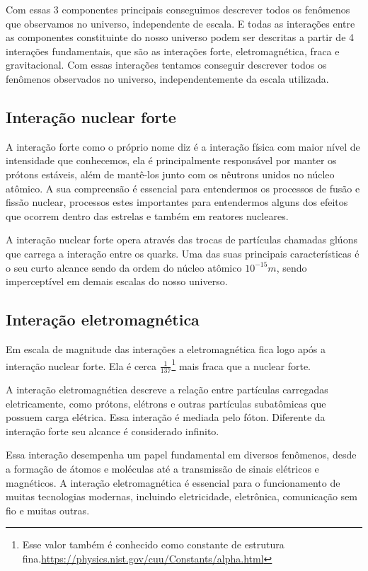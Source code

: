 \documentclass[
	article,			%
	11pt,				%
	twoside,			%
	a4paper,			%
	english,			%
	brazil,				%
	sumario=tradicional
	]{abntex2}
\begin{document}
Com essas 3 componentes principais conseguimos descrever todos os fenômenos que observamos no universo, independente de escala. E todas as interações entre as componentes constituinte do nosso universo podem ser descritas a partir de 4 interações fundamentais, que são as interações forte, eletromagnética, fraca e gravitacional. Com essas interações tentamos conseguir descrever todos os fenômenos observados no universo, independentemente da escala utilizada.

\subsection*{Interação nuclear forte}

A interação forte como o próprio nome diz é a interação física com maior nível de intensidade que conhecemos, ela é principalmente responsável por manter os prótons estáveis, além de mantê-los junto com os nêutrons unidos no núcleo atômico. A sua compreensão é essencial para entendermos os processos de fusão e fissão nuclear, processos estes importantes para entendermos alguns dos efeitos que ocorrem dentro das estrelas e também em reatores nucleares.

A interação nuclear forte opera através das trocas de partículas chamadas glúons que carrega a interação entre os quarks. Uma das suas principais características é o seu curto alcance sendo da ordem do núcleo atômico $10^{-15}m$, sendo imperceptível em demais escalas do nosso universo.

\subsection*{Interação eletromagnética}
Em escala de magnitude das interações a eletromagnética fica logo após a interação nuclear forte. Ela é cerca $\frac{1}{137}$\footnote{Esse valor também é conhecido como constante de estrutura fina.\url{https://physics.nist.gov/cuu/Constants/alpha.html}} mais fraca que a nuclear forte.

A interação eletromagnética descreve a relação entre partículas carregadas eletricamente, como prótons, elétrons e outras partículas subatômicas que possuem carga elétrica. Essa interação é mediada pelo fóton. Diferente da interação forte seu alcance é considerado infinito.

Essa interação desempenha um papel fundamental em diversos fenômenos, desde a formação de átomos e moléculas até a transmissão de sinais elétricos e magnéticos. A interação eletromagnética é essencial para o funcionamento de muitas tecnologias modernas, incluindo eletricidade, eletrônica, comunicação sem fio e muitas outras.
\end{document}
